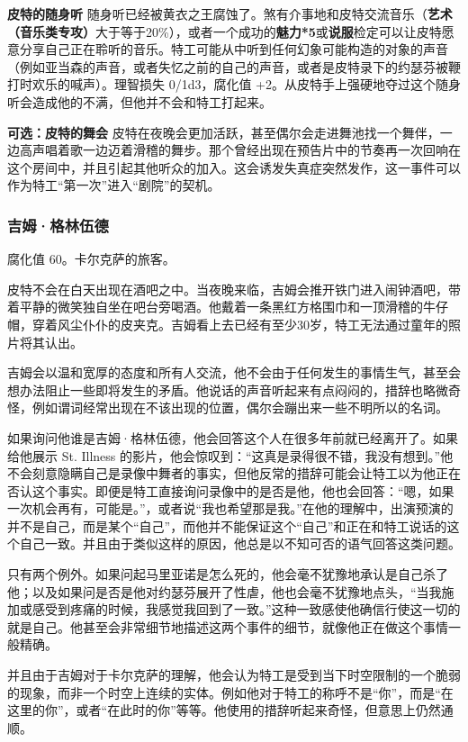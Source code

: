 \textbf{皮特的随身听}
随身听已经被黄衣之王腐蚀了。煞有介事地和皮特交流音乐（\textbf{艺术（音乐类专攻）}大于等于20\%），或者一个成功的\textbf{魅力*5}或\textbf{说服}检定可以让皮特愿意分享自己正在聆听的音乐。特工可能从中听到任何幻象可能构造的对象的声音（例如亚当森的声音，或者失忆之前的自己的声音，或者是皮特录下的约瑟芬被鞭打时欢乐的喊声）。理智损失 0/1d3，腐化值 +2。从皮特手上强硬地夺过这个随身听会造成他的不满，但他并不会和特工打起来。

\textbf{可选：皮特的舞会}
皮特在夜晚会更加活跃，甚至偶尔会走进舞池找一个舞伴，一边高声唱着歌一边迈着滑稽的舞步。那个曾经出现在预告片中的节奏再一次回响在这个房间中，并且引起其他听众的加入。这会诱发失真症突然发作，这一事件可以作为特工“第一次”进入“剧院”的契机。

\subsubsection{吉姆·格林伍德}
腐化值 60。卡尔克萨的旅客。

皮特不会在白天出现在酒吧之中。当夜晚来临，吉姆会推开铁门进入闹钟酒吧，带着平静的微笑独自坐在吧台旁喝酒。他戴着一条黑红方格围巾和一顶滑稽的牛仔帽，穿着风尘仆仆的皮夹克。吉姆看上去已经有至少30岁，特工无法通过童年的照片将其认出。

吉姆会以温和宽厚的态度和所有人交流，他不会由于任何发生的事情生气，甚至会想办法阻止一些即将发生的矛盾。他说话的声音听起来有点闷闷的，措辞也略微奇怪，例如谓词经常出现在不该出现的位置，偶尔会蹦出来一些不明所以的名词。

如果询问他谁是吉姆·格林伍德，他会回答这个人在很多年前就已经离开了。如果给他展示 St. Illness 的影片，他会惊叹到：“这真是录得很不错，我没有想到。”他不会刻意隐瞒自己是录像中舞者的事实，但他反常的措辞可能会让特工以为他正在否认这个事实。即便是特工直接询问录像中的是否是他，他也会回答：“嗯，如果一次机会再有，可能是。”，或者说“我也希望那是我。”在他的理解中，出演预演的并不是自己，而是某个“自己”，而他并不能保证这个“自己”和正在和特工说话的这个自己一致。并且由于类似这样的原因，他总是以不知可否的语气回答这类问题。

只有两个例外。如果问起马里亚诺是怎么死的，他会毫不犹豫地承认是自己杀了他；以及如果问是否是他对约瑟芬展开了性虐，他也会毫不犹豫地点头，“当我施加或感受到疼痛的时候，我感觉我回到了一致。”这种一致感使他确信行使这一切的就是自己。他甚至会非常细节地描述这两个事件的细节，就像他正在做这个事情一般精确。

并且由于吉姆对于卡尔克萨的理解，他会认为特工是受到当下时空限制的一个脆弱的现象，而非一个时空上连续的实体。例如他对于特工的称呼不是“你”，而是“在这里的你”，或者“在此时的你”等等。他使用的措辞听起来奇怪，但意思上仍然通顺。

